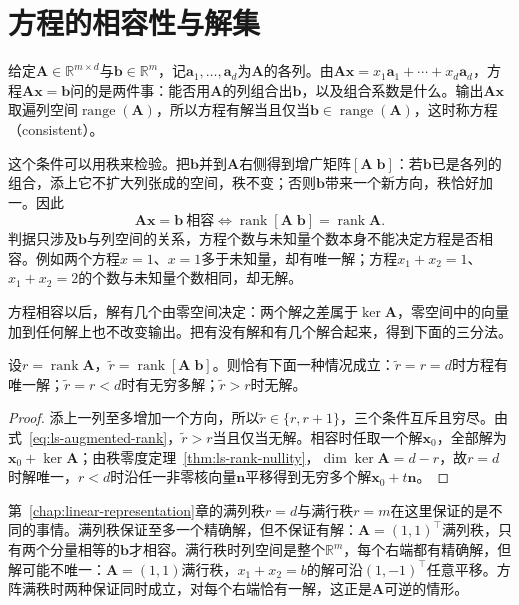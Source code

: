 \section{方程的相容性与解集}
\label{sec:ls-solution-cases}

给定$\bm A\in\mathbb R^{m\times d}$与$\bm b\in\mathbb R^m$，记$\bm a_1,\ldots,\bm a_d$为$\bm A$的各列。由$\bm A\bm x=x_1\bm a_1+\cdots+x_d\bm a_d$，方程$\bm A\bm x=\bm b$问的是两件事：能否用$\bm A$的列组合出$\bm b$，以及组合系数是什么。输出$\bm A\bm x$取遍列空间$\operatorname{range}(\bm A)$，所以方程有解当且仅当$\bm b\in\operatorname{range}(\bm A)$，这时称方程（consistent）。

这个条件可以用秩来检验。把$\bm b$并到$\bm A$右侧得到增广矩阵$[\bm A\;\bm b]$：若$\bm b$已是各列的组合，添上它不扩大列张成的空间，秩不变；否则$\bm b$带来一个新方向，秩恰好加一。因此
\begin{equation}
 \bm A\bm x=\bm b\ \text{相容}\iff
 \operatorname{rank}[\bm A\;\bm b]=\operatorname{rank}\bm A .
 \label{eq:ls-augmented-rank}
\end{equation}
判据只涉及$\bm b$与列空间的关系，方程个数与未知量个数本身不能决定方程是否相容。例如两个方程$x=1$、$x=1$多于未知量，却有唯一解；方程$x_1+x_2=1$、$x_1+x_2=2$的个数与未知量个数相同，却无解。

方程相容以后，解有几个由零空间决定：两个解之差属于$\ker\bm A$，零空间中的向量加到任何解上也不改变输出。把有没有解和有几个解合起来，得到下面的三分法。

\begin{theorem}[线性方程的三种情况]
\label{thm:ls-three-solution-cases}
设$r=\operatorname{rank}\bm A$，$\tilde r=\operatorname{rank}[\bm A\;\bm b]$。则恰有下面一种情况成立：$\tilde r=r=d$时方程有唯一解；$\tilde r=r<d$时有无穷多解；$\tilde r>r$时无解。
\end{theorem}
\begin{proof}
添上一列至多增加一个方向，所以$\tilde r\in\{r,r+1\}$，三个条件互斥且穷尽。由式~\eqref{eq:ls-augmented-rank}，$\tilde r>r$当且仅当无解。相容时任取一个解$\bm x_0$，全部解为$\bm x_0+\ker\bm A$；由秩零度定理~\ref{thm:ls-rank-nullity}，$\dim\ker\bm A=d-r$，故$r=d$时解唯一，$r<d$时沿任一非零核向量$\bm n$平移得到无穷多个解$\bm x_0+t\bm n$。
\end{proof}

第~\ref{chap:linear-representation}章的满列秩$r=d$与满行秩$r=m$在这里保证的是不同的事情。满列秩保证至多一个精确解，但不保证有解：$\bm A=(1,1)^\top$满列秩，只有两个分量相等的$\bm b$才相容。满行秩时列空间是整个$\mathbb R^m$，每个右端都有精确解，但解可能不唯一：$\bm A=(1,1)$满行秩，$x_1+x_2=b$的解可沿$(1,-1)^\top$任意平移。方阵满秩时两种保证同时成立，对每个右端恰有一解，这正是$\bm A$可逆的情形。

